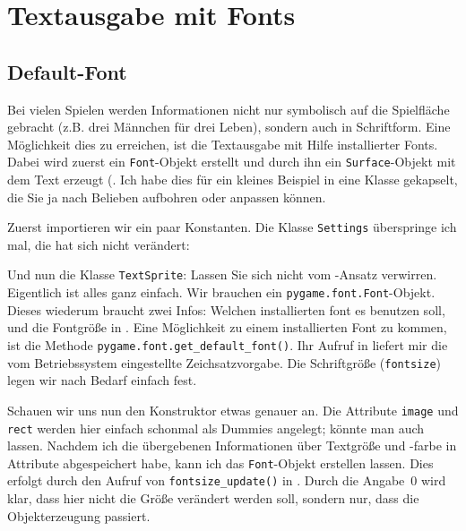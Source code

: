 \newpage
\section{Textausgabe mit Fonts}
\subsection{Default-Font}

Bei vielen Spielen werden Informationen nicht nur symbolisch auf die Spielfläche gebracht (z.B. drei Männchen für drei Leben), sondern auch in Schriftform. Eine Möglichkeit dies zu erreichen, ist die Textausgabe mit Hilfe installierter Fonts. Dabei wird zuerst ein \texttt{Font}-Objekt erstellt und durch ihn ein \texttt{Surface}-Objekt mit dem Text erzeugt (. Ich habe dies für ein kleines Beispiel in eine Klasse gekapselt, die Sie ja nach Belieben aufbohren oder anpassen können.

Zuerst importieren wir ein paar Konstanten. Die Klasse \texttt{Settings} überspringe ich mal, die hat sich nicht verändert:


Und nun die Klasse \texttt{TextSprite}: Lassen Sie sich nicht vom -Ansatz verwirren. Eigentlich ist alles ganz einfach. Wir brauchen ein \texttt{pygame.font.\-Font}-Objekt. Dieses wiederum braucht zwei Infos: Welchen installierten \Gls{font} es benutzen soll, und die Fontgröße in . Eine Möglichkeit zu einem installierten Font zu kommen, ist die Methode \texttt{pygame.font.get\_default\_font()}. Ihr Aufruf in  liefert mir die vom Betriebssystem eingestellte Zeichsatzvorgabe. Die Schriftgröße (\texttt{fontsize}) legen wir nach Bedarf einfach fest. 


Schauen wir uns nun den Konstruktor etwas genauer an. Die  Attribute \texttt{image} und \texttt{rect} werden hier einfach schonmal als Dummies angelegt; könnte man auch lassen. Nachdem ich die übergebenen Informationen über Textgröße und -farbe in Attribute abgespeichert habe, kann ich das \texttt{Font}-Objekt erstellen lassen. Dies erfolgt durch den Aufruf von \texttt{fontsize\_update()} in . Durch die Angabe~0 wird klar, dass hier nicht die Größe verändert werden soll, sondern nur, dass die Objekterzeugung passiert. 

